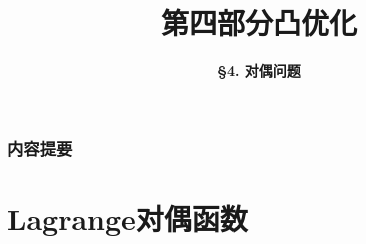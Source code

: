 



\title[Convex Optimization]{\LARGE \bfseries 第四部分\quad 凸优化} %
\author[Dual Problems] %
{\Large \bfseries \S 4. 对偶问题}
\date{}






\begin{frame}

\titlepage %

\end{frame}


\begin{frame}
\frametitle{内容提要} %
\tableofcontents %
\end{frame}


\section{Lagrange对偶函数}


